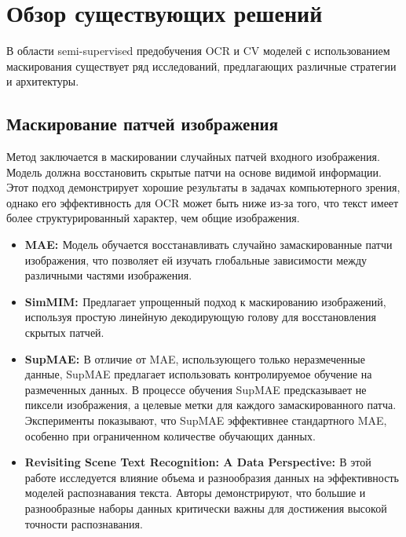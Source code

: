\section{Обзор существующих решений}
\label{sec:Chapter2} 


В  области  semi-supervised  предобучения  OCR и CV моделей  с  использованием  маскирования  существует  ряд  исследований, предлагающих  различные  стратегии  и  архитектуры.
\subsection{Маскирование  патчей  изображения}
Метод заключается в маскировании случайных патчей входного изображения.  Модель должна восстановить скрытые патчи на основе видимой информации. Этот подход демонстрирует  хорошие  результаты  в  задачах  компьютерного  зрения,  однако  его  эффективность  для  OCR  может  быть  ниже  из-за  того,  что  текст  имеет  более  структурированный  характер,  чем  общие  изображения.
\begin{itemize}
    \item \textbf{MAE: \cite{he2021masked}}  Модель  обучается  восстанавливать  случайно  замаскированные  патчи  изображения,  что  позволяет  ей  изучать  глобальные  зависимости  между  различными  частями  изображения.

    \item \textbf{SimMIM: \cite{xie2021simmim}}  Предлагает  упрощенный  подход  к  маскированию  изображений,  используя  простую  линейную  декодирующую  голову  для  восстановления  скрытых  патчей.

    \item \textbf{SupMAE: \cite{gao2022supmae}} В отличие от MAE, использующего только неразмеченные данные, SupMAE предлагает использовать контролируемое обучение на размеченных данных. В процессе обучения SupMAE предсказывает не пиксели изображения, а целевые метки для каждого замаскированного патча.  Эксперименты показывают, что SupMAE  эффективнее стандартного MAE, особенно при ограниченном количестве обучающих данных.
 
    \item \textbf{Revisiting Scene Text Recognition: A Data Perspective: \cite{baek2019revisiting}}  В  этой  работе  исследуется  влияние  объема  и  разнообразия  данных  на  эффективность  моделей  распознавания  текста.  Авторы  демонстрируют,  что  большие  и  разнообразные  наборы  данных  критически  важны  для  достижения  высокой  точности  распознавания.  
\end{itemize}

